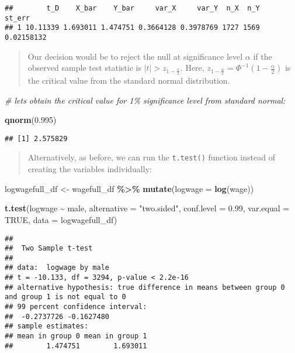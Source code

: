 \documentclass[
]{article}
\newenvironment{Shaded}{\begin{snugshade}}{\end{snugshade}}
\newcommand{\AttributeTok}[1]{\textcolor[rgb]{0.13,0.29,0.53}{#1}}
\newcommand{\CommentTok}[1]{\textcolor[rgb]{0.56,0.35,0.01}{\textit{#1}}}
\newcommand{\ConstantTok}[1]{\textcolor[rgb]{0.56,0.35,0.01}{#1}}
\newcommand{\FloatTok}[1]{\textcolor[rgb]{0.00,0.00,0.81}{#1}}
\newcommand{\FunctionTok}[1]{\textcolor[rgb]{0.13,0.29,0.53}{\textbf{#1}}}
\newcommand{\NormalTok}[1]{#1}
\newcommand{\OtherTok}[1]{\textcolor[rgb]{0.56,0.35,0.01}{#1}}
\newcommand{\SpecialCharTok}[1]{\textcolor[rgb]{0.81,0.36,0.00}{\textbf{#1}}}
\newcommand{\StringTok}[1]{\textcolor[rgb]{0.31,0.60,0.02}{#1}}
\begin{document}
\begin{verbatim}
##        t_D    X_bar    Y_bar     var_X     var_Y  n_X  n_Y     st_err
## 1 10.11339 1.693011 1.474751 0.3664128 0.3978769 1727 1569 0.02158132
\end{verbatim}

\begin{quote}
Our decision would be to reject the null at significance level
\(\alpha\) if the observed sample test statistic is
\(|t| > z_{1-\frac{\alpha}{2}}\). Here,
\(z_{1-\frac{\alpha}{2}} = \Phi^{-1}(1-\frac{\alpha}{2})\) is the
critical value from the standard normal distribution.
\end{quote}

\begin{Shaded}
\begin{Highlighting}[]
\CommentTok{\# let\textquotesingle{}s obtain the critical value for 1\% significance level from standard normal:}

\FunctionTok{qnorm}\NormalTok{(}\FloatTok{0.995}\NormalTok{)}
\end{Highlighting}
\end{Shaded}

\begin{verbatim}
## [1] 2.575829
\end{verbatim}

\begin{quote}
Alternatively, as before, we can run the \texttt{t.test()} function
instead of creating the variables individually:
\end{quote}

\begin{Shaded}
\begin{Highlighting}[]
\NormalTok{logwagefull\_df }\OtherTok{\textless{}{-}}\NormalTok{ wagefull\_df }\SpecialCharTok{\%\textgreater{}\%}
  \FunctionTok{mutate}\NormalTok{(}\AttributeTok{logwage =} \FunctionTok{log}\NormalTok{(wage)) }

\FunctionTok{t.test}\NormalTok{(logwage }\SpecialCharTok{\textasciitilde{}}\NormalTok{ male,}
       \AttributeTok{alternative =} \StringTok{"two.sided"}\NormalTok{,}
       \AttributeTok{conf.level =} \FloatTok{0.99}\NormalTok{,}
       \AttributeTok{var.equal =} \ConstantTok{TRUE}\NormalTok{,}
       \AttributeTok{data =}\NormalTok{ logwagefull\_df)}
\end{Highlighting}
\end{Shaded}

\begin{verbatim}
## 
##  Two Sample t-test
## 
## data:  logwage by male
## t = -10.133, df = 3294, p-value < 2.2e-16
## alternative hypothesis: true difference in means between group 0 and group 1 is not equal to 0
## 99 percent confidence interval:
##  -0.2737726 -0.1627480
## sample estimates:
## mean in group 0 mean in group 1 
##        1.474751        1.693011
\end{verbatim}
\end{document}
